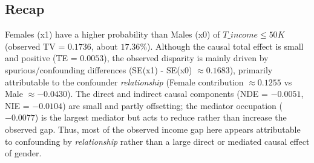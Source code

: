 \documentclass{article}
\begin{document}
\subsection*{Recap}
Females (x1) have a higher probability than Males (x0) of $T\_income \leq 50K$ (observed TV = $0.1736$, about $17.36\%$). Although the causal total effect is small and positive (TE = $0.0053$), the observed disparity is mainly driven by spurious/confounding differences (SE(x1) - SE(x0) $\approx 0.1683$), primarily attributable to the confounder \textit{relationship} (Female contribution $\approx 0.1255$ vs Male $\approx -0.0430$). The direct and indirect causal components (NDE = $-0.0051$, NIE = $-0.0104$) are small and partly offsetting; the mediator occupation ($-0.0077$) is the largest mediator but acts to reduce rather than increase the observed gap. Thus, most of the observed income gap here appears attributable to confounding by \textit{relationship} rather than a large direct or mediated causal effect of gender.
\end{document}
